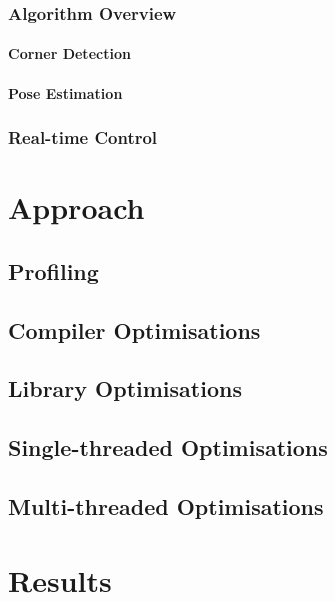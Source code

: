 \documentclass[10pt, twocolumn]{scrartcl} %
\begin{document}
\subsubsection{Algorithm Overview}
\paragraph{Corner Detection}
\paragraph{Pose Estimation}

\subsubsection{Real-time Control}

\section{Approach}

\subsection{Profiling}



\subsection{Compiler Optimisations}

\subsection{Library Optimisations}

\subsection{Single-threaded Optimisations}

\subsection{Multi-threaded Optimisations}


\section{Results}
\end{document}
